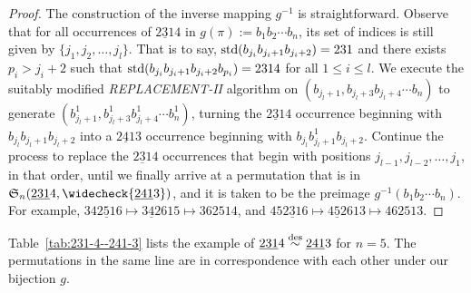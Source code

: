 \begin{proof}
  The construction of the inverse mapping $g^{-1}$ is straightforward. Observe that for all occurrences of $\underline{231}4$ in $g(\pi):=b_1b_2\cdots b_n$, its set of indices is still given by $\{j_1,j_2,\ldots,j_l\}$. That is to say, $\mathrm{std}(b_{j_i}b_{j_i+1}b_{j_i+2})=231$ and there exists $p_i>j_i+2$
  such that $\mathrm{std}(b_{j_i}b_{j_i+1}b_{j_i+2}b_{p_i})=2314$ for all $1\le i \le l$.
  We execute the suitably modified \textit{REPLACEMENT-II} algorithm on $(b_{j_l+1},b_{j_l+3}b_{j_l+4}\cdots b_n)$ to generate $(b_{j_l+1}^1,b_{j_l+3}^1b_{j_l+4}^1\cdots b_n^1)$, turning the $\underline{231}4$ occurrence beginning with $b_{j_l}b_{j_l+1}b_{j_l+2}$ into a $\underline{241}3$ occurrence beginning with $b_{j_l}b_{j_l+1}^1b_{j_l+2}$. Continue the process to replace the $\underline{231}4$ occurrences that begin with positions $j_{l-1},j_{l-2},\ldots,j_1$, in that order, until we finally arrive at a permutation that is in $\S_n(\underline{231}4,\widecheck{\underline{241}3})$, and it is taken to be the preimage $g^{-1}(b_1b_2\cdots b_n)$. For example, $34\underline{251}6\mapsto  \underline{342}615 \mapsto 362514 $, and $45\underline{231}6 \mapsto  \underline{452}613 \mapsto 462513$.
\end{proof}

Table~\ref{tab:231-4--241-3} lists the example of $\underline{231}4\overset{\mathrm{des}}{\sim} \underline{241}3$ for $n=5$.
The permutations in the same line are in correspondence with each other under our bijection $g$.

